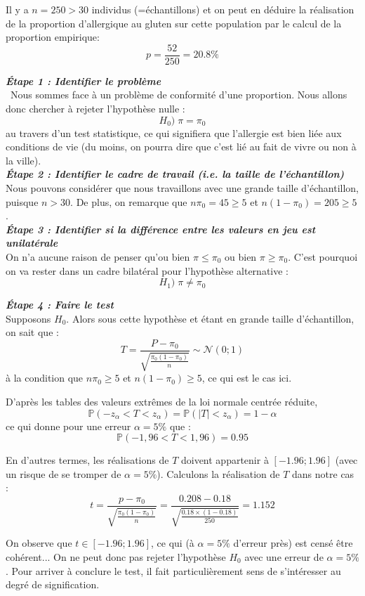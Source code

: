 \documentclass[a4paper,oneside,12pt]{article}
\theoremstyle{plain}
\def\P{{\mathbb P}}
\begin{document}
Il y a $n = 250>30$ individus (=échantillons) et on peut en déduire la réalisation de la proportion d'allergique au gluten sur cette population par le calcul de la proportion empirique:
$$p = \frac{52}{250} = 20.8\% $$
    
\textit{\textbf{Étape 1 : Identifier le problème}}\\\
Nous sommes face à un problème de conformité d'une proportion. Nous allons donc chercher à rejeter l'hypothèse nulle :
$$H_0) \;\pi=\pi_0$$ 
au travers d'un test statistique, ce qui signifiera que l'allergie est bien liée aux conditions de vie (du moins, on pourra dire que c'est lié au fait de vivre ou non à la ville).\\
    
\textit{\textbf{Étape 2 : Identifier le cadre de travail (i.e. la taille de l'échantillon)}}\\
Nous pouvons considérer que nous travaillons avec une grande taille d'échantillon, puisque $n>30$. De plus, on remarque que $n\pi_0 =45\ge 5$ et $n(1-\pi_0) = 205 \ge 5$.\\
    
\textit{\textbf{Étape 3 : Identifier si la différence entre les valeurs en jeu est unilatérale}}\\
On n'a aucune raison de penser qu'ou bien $\pi\le \pi_0$ ou bien $\pi\ge \pi_0$. C'est pourquoi on va rester dans un cadre bilatéral pour l'hypothèse alternative : $$H_1) \;\pi \neq \pi_0$$
    
\textit{\textbf{Étape 4 : Faire le test}}\\
Supposons $H_0$. Alors sous cette hypothèse et étant en grande taille d'échantillon, on sait que :
$$ T = \frac{P-\pi_0}{\sqrt{\frac{\pi_0(1-\pi_0)}{n}}} \sim \mathcal{N}(0;1)$$
à la condition que $n\pi_0\ge 5$ et $n(1-\pi_0)\ge 5$, ce qui est le cas ici.


D'après les tables des valeurs extrêmes de la loi normale centrée réduite, 
$$\P(-z_\alpha<T<z_\alpha) = \P(|T|<z_\alpha) = 1-\alpha$$
ce qui donne pour une erreur $\alpha = 5\%$ que :
$$\P(-1,96 < T < 1,96) = 0.95$$
    
En d'autres termes, les réalisations de $T$ doivent appartenir à $[-1.96;1.96]$ (avec un risque de se tromper de $\alpha = 5\%$). Calculons la réalisation de $T$ dans notre cas :
$$ t = \frac{p-\pi_0}{\sqrt{\frac{\pi_0(1-\pi_0)}{n}}} =  \frac{0.208-0.18}{\sqrt{\frac{0.18\times(1-0.18)}{250}}} =1.152$$
    
On observe que $t\in [-1.96;1.96]$, ce qui (à $\alpha = 5\%$ d'erreur près) est censé être cohérent... On ne peut donc pas rejeter l'hypothèse $H_0$ avec une erreur de $\alpha = 5\%$. Pour arriver à conclure le test, il fait particulièrement sens de s'intéresser au degré de signification.\\
    
\end{document}
